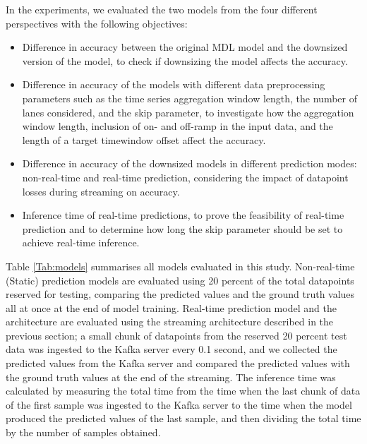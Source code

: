 \documentclass[11pt]{uonthesis}
\begin{document}
In the experiments, we evaluated the two models from the four different perspectives with the following objectives:
\begin{itemize}
    \item Difference in accuracy between the original MDL model and the downsized version of the model, to check if downsizing the model affects the accuracy.
    \item Difference in accuracy of the models with different data preprocessing parameters such as the time series aggregation window length, the number of lanes considered, and the skip parameter, to investigate how the aggregation window length, inclusion of on- and off-ramp in the input data, and the length of a target timewindow offset affect the accuracy.
    \item Difference in accuracy of the downsized models in different prediction modes: non-real-time and real-time prediction, considering the impact of datapoint losses during streaming on accuracy.
    \item Inference time of real-time predictions, to prove the feasibility of real-time prediction and to determine how long the skip parameter should be set to achieve real-time inference.
\end{itemize}

Table \ref{Tab:models} summarises all models evaluated in this study. Non-real-time (Static) prediction models are evaluated using 20 percent of the total datapoints reserved for testing, comparing the predicted values and the ground truth values all at once at the end of model training. Real-time prediction model and the architecture are evaluated using the streaming architecture described in the previous section; a small chunk of datapoints from the reserved 20 percent test data was ingested to the Kafka server every 0.1 second, and we collected the predicted values from the Kafka server and compared the predicted values with the ground truth values at the end of the streaming. The inference time was calculated by measuring the total time from the time when the last chunk of data of the first sample was ingested to the Kafka server to the time when the model produced the predicted values of the last sample, and then dividing the total time by the number of samples obtained.
\end{document}
